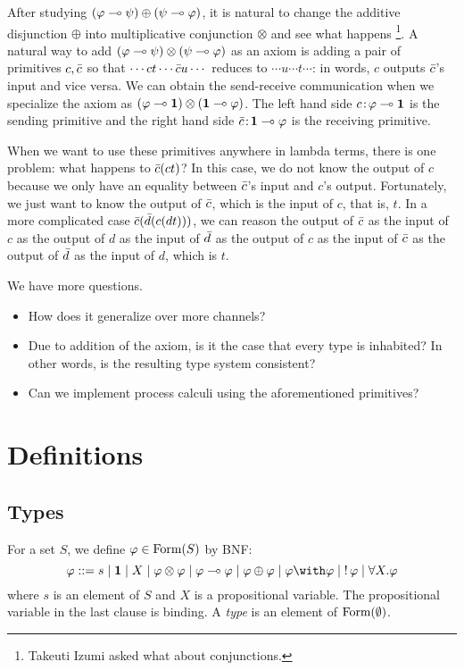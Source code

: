 After studying $(\varphi\multimap\psi)\oplus (\psi\multimap\varphi)$,
it is natural to change the additive disjunction $\oplus$ into
multiplicative conjunction $\otimes$ and see what happens%
\footnote{Takeuti Izumi asked what about conjunctions.}.
A natural way to add $(\varphi\multimap\psi)\otimes(\psi\multimap\varphi)$ as an axiom
is adding a pair of primitives $c,\bar{c}$ so that
$\cdots ct \cdots \bar{c} u \cdots$ reduces to
$\cdots u  \cdots t \cdots$: in words,
$c$ outputs $\bar{c}$'s input and vice versa.
We can obtain the send-receive communication when we specialize the
axiom as $(\varphi\multimap \mathbf{1})\otimes(\mathbf{1}\multimap\varphi)$.  The left hand side
${c} \mathord{\colon\kern -2pt}{\varphi\multimap\mathbf{1}}$ is the sending primitive and
the right hand side ${\bar{c}} \mathord{\colon\kern -2pt}{\mathbf{1} \multimap\varphi}$ is the receiving
primitive.

When we want to use these primitives anywhere in lambda terms,
there is one problem: what happens to $\bar{c}(c t)$?
In this case, we do not know the output of $c$ because we only have an
equality between $\bar{c}$'s input and $c$'s output.
Fortunately, we just want to know the output of $\bar{c}$, which is the
input of $c$, that is, $t$.
In a more complicated case $\bar{c}(\bar{d}(c (d t)))$,
we can reason the output of $\bar{c}$ as the input of $c$ as the output of
$d$ as the input of $\bar{d}$ as the output of $c$ as the input of $\bar{c}$
as the output of $\bar{d}$ as the input of $d$, which is $t$.

We have more questions.
\begin{itemize}
 \item How does it generalize over more channels?
 \item Due to addition of the axiom, is it the case that
       every type is inhabited?  In other words,
      is the resulting type system consistent?
 \item Can we implement process calculi using the aforementioned primitives?
\end{itemize}

\section{Definitions}

\subsection{Types}
For a set $S$, we define $\varphi\in\mathop{\text{Form}}(S)$ by BNF:
\[
 \phi::=s\mid \one \mid X \mid \phi\otimes\phi\mid \phi\limp\phi\mid
 \phi\oplus\phi\mid \phi\with\phi\mid \bang\phi\mid \forall X.\phi
\]
where $s$ is an element of $S$ and $X$ is a propositional variable.
The propositional variable in the last clause is binding.
A \textit{type} is an element of $\mathop{\text{Form}}(\emptyset)$.

